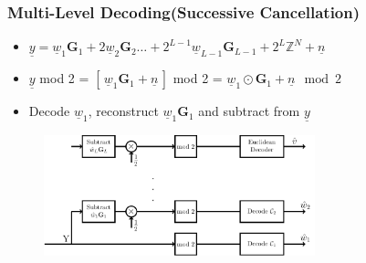 \documentclass[10pt,presentation]{beamer}
\begin{document}
\begin{frame}\frametitle{Multi-Level Decoding(Successive Cancellation) }
      \begin{itemize}
        \item $\underline{y} = \boxed{\underline{w}_1 \mathbf{G}_1 + 2 \underline{w}_2 \mathbf{G}_2 \ldots +2^{L-1} \underline{w}_{L-1} \mathbf{G}_{L-1} +2^{L}\mathbb{Z}^{N}} + \underline{n}$
         \vspace{0.05in}	
         \item $\underline{y}$ mod 2 = $ \left[\,\underline{w}_1 \mathbf{G}_1 + \underline{n}\,\right] $ mod 2 = $\underline{w}_1 \odot \mathbf{G}            _1 + \boxed{\underline{n} \mod 2}$
         \vspace{0.05in}
		\item Decode $\underline{w}_1$, reconstruct $\underline{w}_1 \mathbf{G}_1$ and subtract from $\underline{y}$
         \vspace{0.2in}
    \end{itemize}
            \begin{figure}
					\includegraphics[width=0.7\textwidth]{multi_stage_decode.pdf}
            \end{figure}
	\end{frame}
\end{document}
